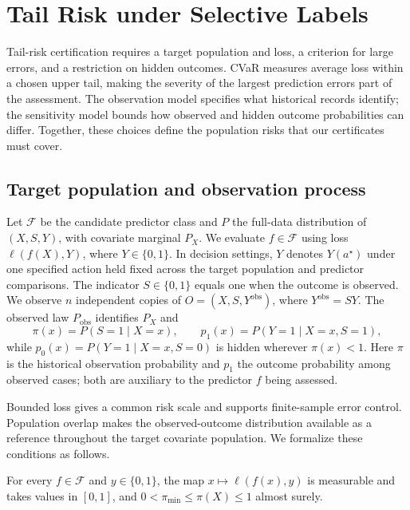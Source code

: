 \section{Tail Risk under Selective Labels}
\label{sec:setup}

Tail-risk certification requires a target population and loss, a criterion for large errors, and a restriction on hidden outcomes. CVaR measures average loss within a chosen upper tail, making the severity of the largest prediction errors part of the assessment. The observation model specifies what historical records identify; the sensitivity model bounds how observed and hidden outcome probabilities can differ. Together, these choices define the population risks that our certificates must cover.

\subsection{Target population and observation process}
\label{sec:target}
Let \(\mathcal F\) be the candidate predictor class and \(P\) the full-data distribution of \((X,S,Y)\), with covariate marginal \(P_X\). We evaluate \(f\in\mathcal F\) using loss \(\ell(f(X),Y)\), where \(Y\in\{0,1\}\). In decision settings, \(Y\) denotes \(Y(a^\star)\) under one specified action held fixed across the target population and predictor comparisons. The indicator \(S\in\{0,1\}\) equals one when the outcome is observed. We observe \(n\) independent copies of \(O=(X,S,Y^{\mathrm{obs}})\), where \(Y^{\mathrm{obs}}=SY\). The observed law \(P_{\mathrm{obs}}\) identifies \(P_X\) and
\[
 \pi(x)=P(S=1\mid X=x),
 \qquad p_1(x)=P(Y=1\mid X=x,S=1),
\]
while \(p_0(x)=P(Y=1\mid X=x,S=0)\) is hidden wherever \(\pi(x)<1\). Here \(\pi\) is the historical observation probability and \(p_1\) the outcome probability among observed cases; both are auxiliary to the predictor \(f\) being assessed.

Bounded loss gives a common risk scale and supports finite-sample error control. Population overlap makes the observed-outcome distribution available as a reference throughout the target covariate population. We formalize these conditions as follows.

\begin{assumption}
\label{ass:regularity}
For every \(f\in\mathcal F\) and \(y\in\{0,1\}\), the map \(x\mapsto\ell(f(x),y)\) is measurable and takes values in \([0,1]\), and \(0<\pi_{\min}\le\pi(X)\le1\) almost surely.
\end{assumption}

